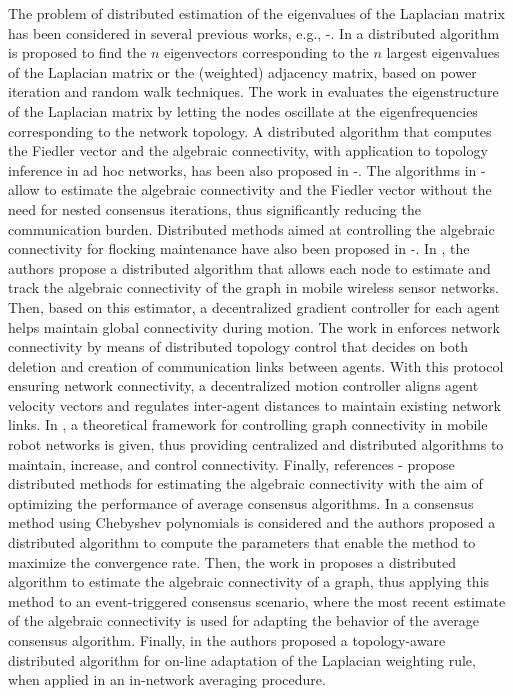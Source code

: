 \documentclass[10pt,twocolumn]{IEEEtran}
\begin{document}
The problem of distributed estimation of the eigenvalues of the Laplacian matrix has been considered in several previous works, e.g., \cite{Kempe-McSherry}-\cite{Bertrand-Moonen2}. In \cite{Kempe-McSherry} a distributed algorithm is proposed to find the $n$ eigenvectors corresponding to the $n$ largest eigenvalues of the Laplacian matrix or the (weighted) adjacency matrix, based on power iteration and random walk techniques. The work in \cite{Franceschelli-Gasparri-Giua-C. Seatzu} evaluates the eigenstructure of the Laplacian matrix by letting the nodes oscillate at the eigenfrequencies corresponding to the network topology. A distributed algorithm that computes the Fiedler vector and the algebraic connectivity, with application to topology inference in ad hoc networks, has been also proposed in \cite{Bertrand-Moonen}-\cite{Bertrand-Moonen2}. The algorithms in \cite{Franceschelli-Gasparri-Giua-C. Seatzu}-\cite{Bertrand-Moonen2} allow to estimate the algebraic connectivity and the Fiedler vector without the need for nested consensus iterations, thus significantly reducing the communication burden. Distributed methods aimed at controlling the algebraic connectivity for flocking maintenance have also been proposed in   \cite{Yang-Freeman}-\cite{Zavlanos-Egerstedt-Pappas}. In \cite{Yang-Freeman}, the authors propose a distributed algorithm that allows each node to estimate and track the algebraic connectivity of the graph in mobile wireless sensor networks. Then, based on this estimator, a decentralized gradient controller for each agent helps maintain global connectivity during motion. The work in \cite{Zavlanos-Tanner-Jadbabaie-Pappas} enforces network connectivity by means of distributed topology control that decides on both deletion and creation of communication links between agents. With this protocol ensuring network connectivity, a decentralized motion controller aligns agent velocity vectors and regulates inter-agent distances to maintain existing network links. In \cite{Zavlanos-Egerstedt-Pappas}, a theoretical framework for controlling graph connectivity in mobile robot networks is given, thus providing centralized and distributed algorithms to maintain, increase, and control connectivity. Finally, references \cite{Montijano-Montijano-Sagues}-\cite{Bertrand-Moonen3} propose distributed methods for estimating the algebraic connectivity with the aim of optimizing the performance of average consensus algorithms. In \cite{Montijano-Montijano-Sagues} a consensus method using Chebyshev polynomials is considered and the authors proposed a distributed algorithm to compute the parameters that enable the method to maximize the convergence rate. Then, the work in \cite{Aragues-Shi-Dimarogonas-Sagues-Johansson} proposes a distributed algorithm to estimate the algebraic connectivity of a graph, thus applying this method to an event-triggered consensus scenario, where the most recent estimate of the algebraic connectivity is used for adapting the behavior of the average consensus algorithm. Finally, in \cite{Bertrand-Moonen3} the authors proposed a topology-aware distributed algorithm for on-line adaptation of the Laplacian weighting rule, when applied in an in-network averaging procedure.
\end{document}
